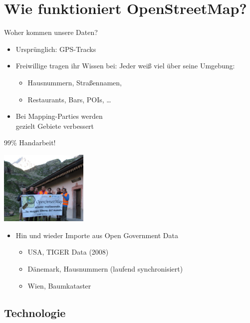 \documentclass{beamer}
\begin{document}
\section{Wie funktioniert OpenStreetMap?}

\begin{frame}{Woher kommen unsere Daten?}

\begin{itemize}
  \item Ursprünglich: GPS-Tracks
  \item Freiwillige tragen ihr Wissen bei: Jeder weiß viel über seine Umgebung:
	\begin{itemize}
	  \item Hausnummern, Straßennamen,
	  \item Restaurants, Bars, POIs, \dots
  \end{itemize}
  \pause
  \item Bei Mapping-Parties werden \\ gezielt Gebiete verbessert
\end{itemize}

  \vspace{0.4cm}
 99\% Handarbeit!

  \vspace*{-2.9cm}
 \hfill \includegraphics[width=4.2cm]{alps_mp.jpg}


  \pause
\begin{itemize}
  \item Hin und wieder Importe aus Open Government Data
  \begin{itemize}
    \item USA, TIGER Data (2008)
    \item Dänemark, Hausnummern (laufend synchronisiert)
    \item Wien, Baumkataster
  \end{itemize}
\end{itemize}

\end{frame}

\subsection{Technologie}
\end{document}
